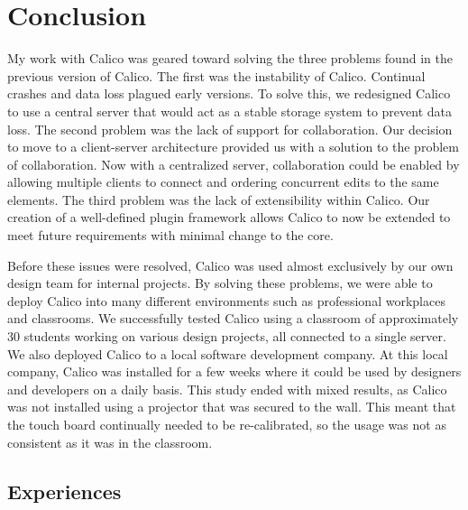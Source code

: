 \chapter{Conclusion}
My work with Calico was geared toward solving the three problems found in the previous version of Calico. The first was the instability of Calico. Continual crashes and data loss plagued early versions. To solve this, we redesigned Calico to use a central server that would act as a stable storage system to prevent data loss. The second problem was the lack of support for collaboration. Our decision to move to a client-server architecture provided us with a solution to the problem of collaboration. Now with a centralized server, collaboration could be enabled by allowing multiple clients to connect and ordering concurrent edits to the same elements. The third problem was the lack of extensibility within Calico. Our creation of a well-defined plugin framework allows Calico to now be extended to meet future requirements with minimal change to the core.

Before these issues were resolved, Calico was used almost exclusively by our own design team for internal projects. By solving these problems, we were able to deploy Calico into many different environments such as professional workplaces and classrooms. We successfully tested Calico using a classroom of approximately 30 students working on various design projects, all connected to a single server. We also deployed Calico to a local software development company. At this local company, Calico was installed for a few weeks where it could be used by designers and developers on a daily basis. This study ended with mixed results, as Calico was not installed using a projector that was secured to the wall. This meant that the touch board continually needed to be re-calibrated, so the usage was not as consistent as it was in the classroom.

\section*{Experiences}



